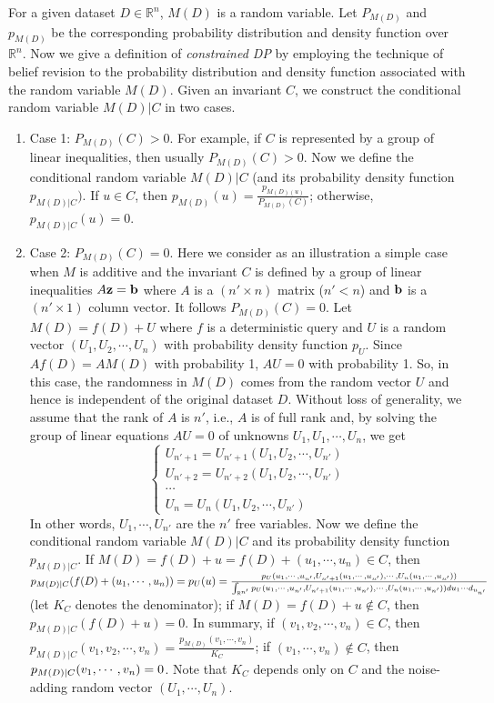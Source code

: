 \documentclass[11pt]{article}
\begin{document}
For a given dataset $D\in \mathbb{R}^n$, $M(D)$ is a random variable. Let $P_{M(D)}$ and $p_{M(D)}$ be the corresponding  probability distribution and density function over $\mathbb{R}^n$. 
Now we give a definition of \emph{constrained DP} by employing the technique of belief revision to the probability distribution and density function associated with the random variable $M(D)$.   Given an invariant $C$, we construct the conditional random variable $M(D)|C$ in two cases. 
\begin{enumerate}
	\item Case 1: $P_{M(D)}(C) >0$.  For example, if $C$ is represented by a group of linear inequalities, then usually $P_{M(D)}(C) >0$. Now we define the conditional random variable $M(D)|C$ (and its probability density function $p_{M(D) |C})$. 
If $u\in C$,  then $p_{M(D)} (u)= \frac{p_{M(D)(u)}}{P_{M(D)}(C)}$; otherwise,  $p_{M(D) |C}(u)=0$.

	\item Case 2:  $P_{M(D)}(C) = 0$.    Here we consider as an illustration a simple case when $M$  is additive and the invariant $C$ is defined by a group of linear inequalities $A\bold{z} = \bold{b}$ where $A$ is a $(n'\times n)$ matrix ($n' < n$) and $\bold{b}$ is a $(n'\times 1)$ column vector. It follows  $P_{M(D)}(C) = 0$. Let $M(D) = f(D) + U$ where $f$ is a deterministic query and $U$ is a random vector $(U_1, U_2, \cdots, U_n)$ with probability density function $p_U$.  Since $Af(D) = AM(D)$ with probability 1, $A U =0$ with probability 1. So, in this case, the randomness in $M(D)$ comes from the random vector $U$ and hence is independent of the original dataset $D$.  Without loss of generality, we assume that the rank of $A$ is $n'$, i.e., $A$ is of full rank and, by solving the group of linear equations $AU=0$ of unknowns $U_1, U_1, \cdots, U_n$, we get 
$$ \left\{
\begin{array}{lr}
U_{n'+1}= U_{n'+1}(U_1, U_2, \cdots, U_{n'})\\
U_{n'+2}= U_{n'+2} (U_1, U_2, \cdots, U_{n'})\\
\cdots \\
U_{n} = U_n (U_1, U_2, \cdots, U_{n'})
\end{array}
\right. $$
In other words, $U_1, \cdots, U_{n'}$ are the $n'$ free variables.  Now we define the conditional random variable $M(D) |C$ and its probability density function $p_{M(D)|C}$.  If $M(D) = f(D)+ u = f(D)+(u_1, \cdots, u_n) \in C$, then $p_{M(D)|C} (f(D)+ (u_1, \cdots, u_n)) = 	p_U(u)=\\
		 \frac{p_U(u_1, \cdots, u_{n'}, U_{n'+1}(u_1, \cdots, u_{n'}), \cdots, U_{n}(u_1, \cdots, u_{n'}))}{\int_{\mathbb{R}^{n'}} p_U(u_1, \cdots, u_{n'}, U_{n'+1}(u_1, \cdots, u_{n'}), \cdots, U_{n}(u_1, \cdots, u_{n'})) du_1\cdots d_{u_{n'}}}$ (let $K_C$ denotes the denominator); if $M(D) = f(D)+ u \not\in C$, then $p_{M(D)|C} (f(D)+u)=0$.  In summary, if $(v_1, v_2, \cdots, v_n)\in C$, then $p_{M(D)|C} (v_1, v_2, \cdots, v_n) = \frac{p_{M(D)}(v_1, \cdots, v_n)}{K_C}$; if $(v_1, \cdots, v_n)\not\in C$, then $p_{M(D)|C}(v_1, \cdots, v_n) \\=0$.  Note that $K_C$ depends only on $C$ and the noise-adding random vector $(U_1, \cdots, U_n)$.   
	


\end{enumerate}
\end{document}
